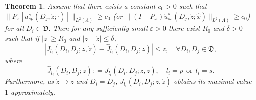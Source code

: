 \documentclass[a4paper,11pt]{article}
\newtheorem{theorem}{Theorem}[section]
\theoremstyle{remark}
\theoremstyle{definition}
\numberwithin{equation}{section}
\begin{document}
\begin{theorem}
 Assume that there exists a constant $c_0>0$ such that $\|P_{\hat{x}}[u_{sp}^s(D_j,\mathring{z};\cdot)]\|_{L^2(\Lambda)} \geq c_0$ (or $\|(I - P_{\hat{x}})\mathring{u}_{ss}^{s}(D_j,\mathring{z};\hat{x})\|_{L^2(\Lambda)} \geq c_0$) for all $D_i \in \mathfrak{D}$. Then for any sufficiently small $\varepsilon>0$ there exist $R_0$ and $\delta>0$ such that
if $|z| \geq R_0$ and $|z-\mathring{z}| \leq \delta$,
\begin{equation}\label{eq:shape:appro}
|J_{l_i}(D_i,D_j;z, \mathring{z}) - \hat{J}_{l_i}(D_i,D_j;z)| \leq z, \quad \forall D_i, D_j \in \mathfrak{D},
\end{equation}
where
\[
\hat{J}_{l_i}(D_i,D_j;z): = J_{l_i}(D_i,D_j;z,z), \quad  l_i = p \ \  \text{or} \  \  l_i=s.
\]
Furthermore, as $\mathring{z} \rightarrow z$ and $D_i = D_j$, $J_{l_i}(D_i,D_j;z, \mathring{z})$ obtains its maximal value $1$ approximately.
\end{theorem}
\end{document}
